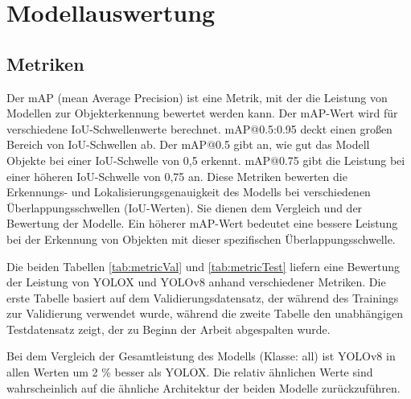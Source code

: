 \chapter{Modellauswertung}
\section{Metriken}
Der mAP (mean Average Precision) ist eine Metrik, mit der die Leistung von Modellen zur Objekterkennung bewertet werden kann. Der mAP-Wert wird für verschiedene IoU-Schwellenwerte berechnet. mAP@0.5:0.95 deckt einen großen Bereich von IoU-Schwellen ab. Der mAP@0.5 gibt an, wie gut das Modell Objekte bei einer IoU-Schwelle von 0,5 erkennt. mAP@0.75 gibt die Leistung bei einer höheren IoU-Schwelle von 0,75 an. Diese Metriken bewerten die Erkennungs- und Lokalisierungsgenauigkeit des Modells bei verschiedenen Überlappungsschwellen (IoU-Werten). Sie dienen dem Vergleich und der Bewertung der Modelle. Ein höherer mAP-Wert bedeutet eine bessere Leistung bei der Erkennung von Objekten mit dieser spezifischen Überlappungsschwelle.

Die beiden Tabellen \ref{tab:metricVal} und \ref{tab:metricTest} liefern eine Bewertung der Leistung von YOLOX und YOLOv8 anhand verschiedener Metriken. Die erste Tabelle basiert auf dem Validierungsdatensatz, der während des Trainings zur Validierung verwendet wurde, während die zweite Tabelle den unabhängigen Testdatensatz zeigt, der zu Beginn der Arbeit abgespalten wurde.

Bei dem Vergleich der Gesamtleistung des Modells (Klasse: all) ist YOLOv8 in allen Werten um 2 \% besser als YOLOX. Die relativ ähnlichen Werte sind wahrscheinlich auf die ähnliche Architektur der beiden Modelle zurückzuführen.

